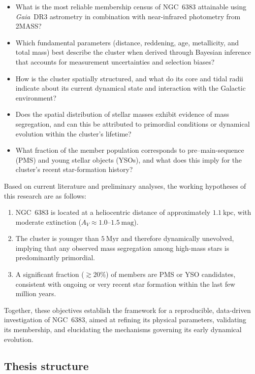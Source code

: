\documentclass[../main.tex]{subfiles}
\begin{document}
\begin{itemize}
    \item What is the most reliable membership census of NGC~6383 attainable using \textit{Gaia}~DR3 astrometry in combination with near-infrared photometry from 2MASS?
    \item Which fundamental parameters (distance, reddening, age, metallicity, and total mass) best describe the cluster when derived through Bayesian inference that accounts for measurement uncertainties and selection biases?
    \item How is the cluster spatially structured, and what do its core and tidal radii indicate about its current dynamical state and interaction with the Galactic environment?
    \item Does the spatial distribution of stellar masses exhibit evidence of mass segregation, and can this be attributed to primordial conditions or dynamical evolution within the cluster’s lifetime?
    \item What fraction of the member population corresponds to pre–main-sequence (PMS) and young stellar objects (YSOs), and what does this imply for the cluster’s recent star-formation history?
\end{itemize}

Based on current literature and preliminary analyses, the working hypotheses of this research are as follows:

\begin{enumerate}
    \item NGC~6383 is located at a heliocentric distance of approximately $1.1~\mathrm{kpc}$, with moderate extinction ($A_V \approx 1.0$--$1.5~\mathrm{mag}$).
    \item The cluster is younger than $5~\mathrm{Myr}$ and therefore dynamically unevolved, implying that any observed mass segregation among high-mass stars is predominantly primordial.
    \item A significant fraction ($\gtrsim 20\%$) of members are PMS or YSO candidates, consistent with ongoing or very recent star formation within the last few million years.
\end{enumerate}

Together, these objectives establish the framework for a reproducible, data-driven investigation of NGC~6383, aimed at refining its physical parameters, validating its membership, and elucidating the mechanisms governing its early dynamical evolution.

\subsection{Thesis structure}
\end{document}
